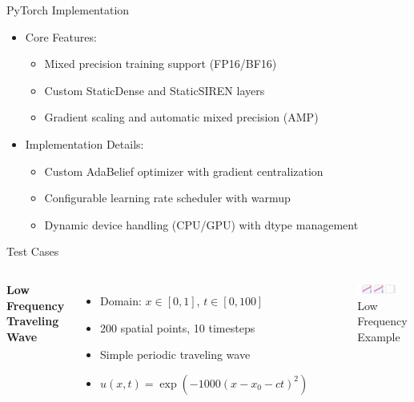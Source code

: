 \documentclass{beamer}
\begin{document}
\begin{frame}{PyTorch Implementation}
    \begin{itemize}
        \item Core Features:
        \begin{itemize}
            \item Mixed precision training support (FP16/BF16)
            \item Custom StaticDense and StaticSIREN layers
            \item Gradient scaling and automatic mixed precision (AMP)
        \end{itemize}
        \item Implementation Details:
        \begin{itemize}
            \item Custom AdaBelief optimizer with gradient centralization
            \item Configurable learning rate scheduler with warmup
            \item Dynamic device handling (CPU/GPU) with dtype management
        \end{itemize}
    \end{itemize}
\end{frame}

\begin{frame}{Test Cases}
    \begin{columns}
        \textbf{Low Frequency Traveling Wave}
        \begin{itemize}
            \item Domain: $x \in [0,1]$, $t \in [0,100]$
            \item 200 spatial points, 10 timesteps
            \item Simple periodic traveling wave
            \item $u(x,t) = \exp(-1000(x-x_0-ct)^2)$
        \end{itemize}
    
    \begin{figure}
        \includegraphics[width=0.85\textwidth,viewport=0 0 400 300,clip]{functional/low-frequency-adam-20250206-1105-1/vis}
            \caption{Low Frequency Example}
        \end{figure}
    \end{columns}
\end{frame}
\end{document}
